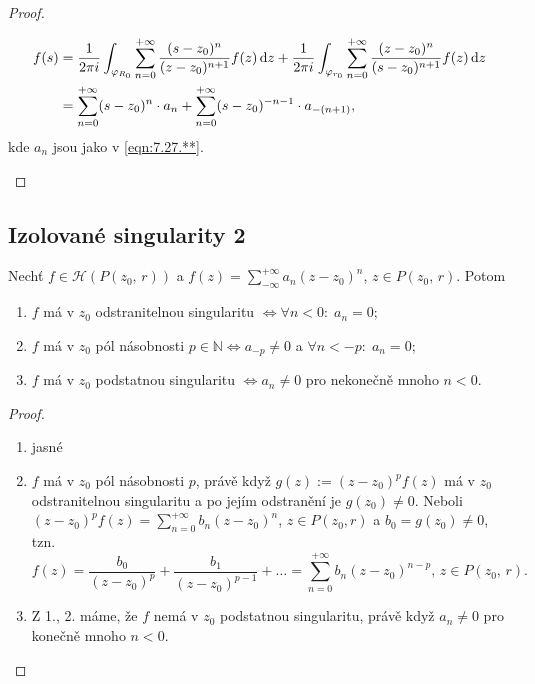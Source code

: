 \begin{proof}
\begin{enumerate}
\begin{equation}
    \begin{aligned}
        f(s)&=\frac{1}{2 \pi i}\int_{\varphi_{R_0}}\sum\limits_{n=0}^{+\infty}\frac{(s-z_0)^n}{(z-z_0)^{n+1}}f(z) \mathop{}\!\mathrm{d} z+\frac{1}{2 \pi i}\int_{\varphi_{r_0}}\sum\limits_{n=0}^{+\infty}\frac{(z-z_0)^n}{(s-z_0)^{n+1}}f(z) \mathop{}\!\mathrm{d} z \\
        &=\sum\limits_{n=0}^{+\infty}(s-z_0)^n\cdot a_n+\sum\limits_{n=0}^{+\infty}(s-z_0)^{-n-1}\cdot a_{-(n+1)},    
    \end{aligned}
\end{equation}
 kde $a_n$ jsou jako v \cref{eqn:7.27.**}.
\end{enumerate}
\end{proof}

\subsection{Izolované singularity 2}
\begin{theorem}
Nechť $f \in \mathcal{H}(P(z_0,\,r))$ a $f(z)=\sum\limits_{-\infty}^{+\infty}a_n(z-z_0)^n$, $z \in P(z_0,\,r)$. Potom
\begin{enumerate}
    \item $f$ má v $z_0$ odstranitelnou singularitu $\Leftrightarrow \forall n<0:\;a_n=0$; 
    \item $f$ má v $z_0$ pól násobnosti $p \in \mathbb{N}\Leftrightarrow a_{-p} \neq 0$ a $\forall n<-p: \;a_n=0$; 
    \item $f$ má v $z_0$ podstatnou singularitu $\Leftrightarrow a_n \neq 0$ pro nekonečně mnoho $n<0$.
\end{enumerate}
\end{theorem}

\begin{proof}
\mbox{}
\begin{enumerate}
    \item jasné
    \item $f$ má v $z_0$ pól násobnosti $p$, právě když $g(z):=(z-z_0)^pf(z)$ má v $z_0$ odstranitelnou singularitu a po jejím odstranění je $g(z_0) \neq 0$. Neboli $(z-z_0)^pf(z)=\sum\limits_{n=0}^{+\infty}b_n(z-z_0)^n$, $z \in P(z_0,r)$ a $b_0=g(z_0) \neq 0$, tzn. 
    $$
    f(z)=\frac{b_0}{(z-z_0)^p}+\frac{b_1}{(z-z_0)^{p-1}}+ \dots=\sum\limits_{n=0}^{+\infty}b_n(z-z_0)^{n-p} \text{, } z \in P(z_0,\,r)\text{.}
    $$
    \item Z 1., 2. máme, že $f$ nemá v $z_0$ podstatnou singularitu, právě když $a_n \neq 0$ pro konečně mnoho $n<0$.
\end{enumerate}
\end{proof}

